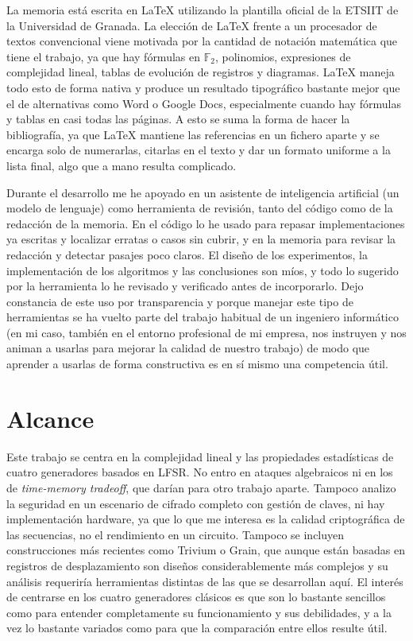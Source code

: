 La memoria está escrita en \LaTeX{} utilizando la plantilla oficial de la ETSIIT de la Universidad de Granada.
La elección de \LaTeX{} frente a un procesador de textos convencional viene motivada por la cantidad de notación matemática
que tiene el trabajo, ya que hay fórmulas en $\mathbb{F}_2$, polinomios, expresiones de complejidad lineal,
tablas de evolución de registros y diagramas. \LaTeX{} maneja todo esto de forma nativa
y produce un resultado tipográfico bastante mejor que el de alternativas como Word o Google Docs,
especialmente cuando hay fórmulas y tablas en casi todas las páginas.
A esto se suma la forma de hacer la bibliografía, ya que \LaTeX{} mantiene las referencias en un fichero aparte
y se encarga solo de numerarlas, citarlas en el texto y dar un formato uniforme a la lista final,
algo que a mano resulta complicado.

Durante el desarrollo me he apoyado en un asistente de inteligencia artificial (un modelo de lenguaje) como herramienta de revisión,
tanto del código como de la redacción de la memoria. En el código lo he usado para repasar implementaciones ya escritas
y localizar erratas o casos sin cubrir, y en la memoria para revisar la redacción y detectar pasajes poco claros.
El diseño de los experimentos, la implementación de los algoritmos y las conclusiones son míos, y todo lo sugerido por la herramienta
lo he revisado y verificado antes de incorporarlo. Dejo constancia de este uso por transparencia y porque manejar este tipo de
herramientas se ha vuelto parte del trabajo habitual de un ingeniero informático (en mi caso, también en el entorno profesional de mi empresa, nos
instruyen y nos animan a usarlas para mejorar la calidad de nuestro trabajo) de modo que aprender a usarlas de forma constructiva es en sí mismo una competencia útil.

\section{Alcance}

Este trabajo se centra en la complejidad lineal y las propiedades estadísticas de cuatro generadores basados en LFSR.
No entro en ataques algebraicos ni en los de \textit{time-memory tradeoff}, que darían para otro trabajo aparte.
Tampoco analizo la seguridad en un escenario de cifrado completo con gestión de claves, ni hay implementación hardware,
ya que lo que me interesa es la calidad criptográfica de las secuencias, no el rendimiento en un circuito.
Tampoco se incluyen construcciones más recientes como Trivium o Grain,
que aunque están basadas en registros de desplazamiento son diseños considerablemente más complejos
y su análisis requeriría herramientas distintas de las que se desarrollan aquí.
El interés de centrarse en los cuatro generadores clásicos es que son lo bastante sencillos
como para entender completamente su funcionamiento y sus debilidades,
y a la vez lo bastante variados como para que la comparación entre ellos resulte útil.

